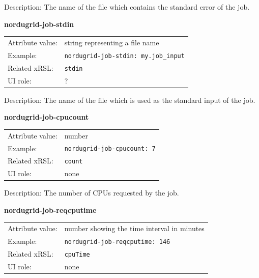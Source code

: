 \documentclass{article}
\begin{document}
Description: The name of the file which contains the standard error of the job.


  \hspace*{0.5cm}
  \begin{shaded}
    \textbf{nordugrid-job-stdin}
  \end{shaded}
  \begin{tabular}{lp{10cm}}  
    Attribute value:& string representing a file name\\
    Example:& \verb#nordugrid-job-stdin: my.job_input#\\
    Related xRSL:& \verb#stdin#\\
    UI role:& ?\\
  \end{tabular}

Description: The name of the file which is used as the standard input of the job.



  \hspace*{0.5cm}
  \begin{shaded}
    \textbf{nordugrid-job-cpucount}
  \end{shaded}
  \begin{tabular}{lp{10cm}}  
    Attribute value:& number\\
    Example:& \verb#nordugrid-job-cpucount: 7#\\
    Related xRSL:& \verb#count#\\
    UI role:& none\\
  \end{tabular}

Description: The number of CPUs requested by the job.


  \hspace*{0.5cm}
  \begin{shaded}
    \textbf{nordugrid-job-reqcputime}
  \end{shaded}
  \begin{tabular}{lp{10cm}}  
    Attribute value:& number showing the time interval in minutes\\
    Example:& \verb#nordugrid-job-reqcputime: 146#\\
    Related xRSL:& \verb#cpuTime#\\
    UI role:& none\\
  \end{tabular}
\end{document}
